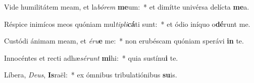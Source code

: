 \item Vide humilitátem meam, et la\textit{bó}\textit{rem} \textbf{me}um:~* et dimítte univérsa delícta \textbf{me}a.
\item Réspice inimícos meos quóniam mul\textit{ti}\textit{pli}\textbf{cá}ti sunt:~* et ódio iníquo o\textbf{dé}runt me.
\item Custódi ánimam meam, et \textit{é}\textit{ru}\textbf{e} me:~* non erubéscam quóniam sperávi \textbf{in} te.
\item Innocéntes et recti adhæ\textit{sé}\textit{runt} \textbf{mi}hi:~* quia sustínu\textbf{i} te.
\item Líbera, \textit{De}\textit{us}, \textbf{Is}raël:~* ex ómnibus tribulatiónibus \textbf{su}is.

